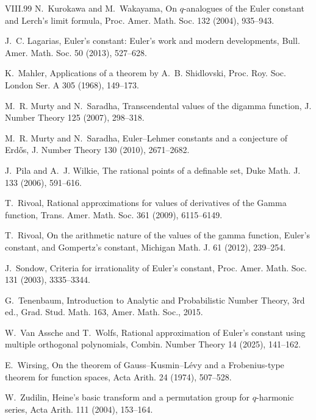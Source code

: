 \documentclass[11pt,a4paper]{article}
\theoremstyle{definition}
\theoremstyle{remark}
\numberwithin{equation}{section}
\renewcommand{\thesection}{\Roman{part}.\arabic{section}}
\renewcommand{\theHsection}{\arabic{part}.main.\arabic{section}}
\begin{document}
\begin{thebibliography}{VIII.99}
 N.~Kurokawa and M.~Wakayama, On $q$-analogues of the Euler constant and Lerch's limit formula, Proc. Amer. Math. Soc. 132 (2004), 935--943.

 J.~C. Lagarias, Euler's constant: Euler's work and modern developments, Bull. Amer. Math. Soc. 50 (2013), 527--628.

 K.~Mahler, Applications of a theorem by A.~B. Shidlovski, Proc. Roy. Soc. London Ser. A 305 (1968), 149--173.

 M.~R. Murty and N.~Saradha, Transcendental values of the digamma function, J. Number Theory 125 (2007), 298--318.

 M.~R. Murty and N.~Saradha, Euler--Lehmer constants and a conjecture of Erd\H{o}s, J. Number Theory 130 (2010), 2671--2682.

 J.~Pila and A.~J. Wilkie, The rational points of a definable set, Duke Math. J. 133 (2006), 591--616.

 T.~Rivoal, Rational approximations for values of derivatives of the Gamma function, Trans. Amer. Math. Soc. 361 (2009), 6115--6149.

 T.~Rivoal, On the arithmetic nature of the values of the gamma function, Euler's constant, and Gompertz's constant, Michigan Math. J. 61 (2012), 239--254.

 J.~Sondow, Criteria for irrationality of Euler's constant, Proc. Amer. Math. Soc. 131 (2003), 3335--3344.

 G.~Tenenbaum, Introduction to Analytic and Probabilistic Number Theory, 3rd ed., Grad. Stud. Math. 163, Amer. Math. Soc., 2015.

 W.~Van Assche and T.~Wolfs, Rational approximation of Euler's constant using multiple orthogonal polynomials, Combin. Number Theory 14 (2025), 141--162.

 E.~Wirsing, On the theorem of Gauss--Kusmin--L\'evy and a Frobenius-type theorem for function spaces, Acta Arith. 24 (1974), 507--528.

 W.~Zudilin, Heine's basic transform and a permutation group for $q$-harmonic series, Acta Arith. 111 (2004), 153--164.

\end{thebibliography}
\label{part4:end}
\clearpage
\setcounter{section}{0}\setcounter{subsection}{0}
\renewcommand{\thesection}{\Roman{part}.\arabic{section}}
\renewcommand{\theHsection}{\arabic{part}.main.\arabic{section}}
\renewcommand{\refname}{References for Part V}
\end{document}
